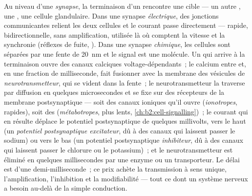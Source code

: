\begin{definition}\label{def:b2:neurons-synapses:synapse}
Au niveau d'une \emph{synapse}, la terminaison d'un  rencontre une
cible --- un autre , une , une cellule
glandulaire. Dans une synapse \emph{électrique}, des jonctions
communicantes relient les deux cellules et le courant passe directement
--- rapide, bidirectionnelle, sans amplification, utilisée là où
comptent la vitesse et la synchronie (réflexes de fuite, ). Dans une
synapse \emph{chimique}, les cellules sont séparées par une fente de
\qty{20}{nm} et le signal est une molécule. Un  qui
arrive à la terminaison ouvre des canaux calciques voltage-dépendants~;
le calcium entre et, en une fraction de milliseconde, fait fusionner
avec la membrane des vésicules de \emph{neurotransmetteur}, qui se
vident dans la fente~; le neurotransmetteur la traverse par diffusion en
quelques microsecondes et se fixe sur des récepteurs de la membrane
postsynaptique --- soit des canaux ioniques qu'il ouvre
(\emph{ionotropes}, rapides), soit des 
(\emph{métabotropes}, plus lents, \cref{ch:b2:cell-signalling})~; le
courant qui en résulte déplace le potentiel postsynaptique de quelques
millivolts, vers le haut (un \emph{potentiel postsynaptique excitateur},
dû à des canaux qui laissent passer le sodium) ou vers le bas (un
potentiel postsynaptique \emph{inhibiteur}, dû à des canaux qui laissent
passer le chlorure ou le potassium)~; et le neurotransmetteur est éliminé
en quelques millisecondes par une enzyme ou un transporteur. Le délai
est d'une demi-milliseconde~; ce prix achète la transmission à sens
unique, l'amplification, l'inhibition et la modifiabilité --- tout ce
dont un système nerveux a besoin au-delà de la simple conduction.
\end{definition}


